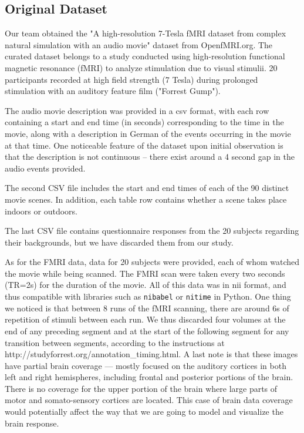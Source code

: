 
\subsection{Original Dataset}
\par Our team obtained the "A high-resolution 7-Tesla fMRI dataset from complex natural simulation with an audio movie" dataset from OpenfMRI.org.\cite{Hanke} The curated dataset belongs to a study conducted using high-resolution functional magnetic resonance (fMRI) to analyze stimulation due to visual stimulii. 20 participants recorded at high field strength (7 Tesla) during prolonged stimulation with an auditory feature film ("Forrest Gump"). 

\par The audio movie description was provided in a csv format, with each row containing a start and end time (in seconds) corresponding to the time in the movie, along with a description in German of the events occurring in the movie at that time. One noticeable feature of the dataset upon initial observation is that the description is not continuous -- there exist around a 4 second gap in the audio events provided. 

\par The second CSV file includes the start and end times of each of the 90 distinct movie scenes. In addition, each table row contains whether a scene takes place indoors or outdoors. 

\par The last CSV file contains questionnaire responses from the 20 subjects regarding their backgrounds,  but we have discarded them from our study. 

\par As for the FMRI data, data for 20 subjects were provided, each of whom watched the movie while being scanned. The FMRI scan were taken every two seconds (TR=2s) for the duration of the movie. All of this data was in nii format, and thus compatible with libraries such as \texttt{nibabel} or \texttt{nitime} in Python. One thing we noticed is that between 8 runs of the fMRI scanning, there are around 6s of repetition of stimuli between each run. We thus discarded four volumes at the end of any preceding segment and at the start of the following segment for any transition between segments, according to the instructions at http://studyforrest.org/annotation\_timing.html. A last note is that these images have partial brain coverage — mostly focused on the auditory cortices in both left and right hemispheres, including frontal and posterior portions of the brain. There is no coverage for the upper portion of the brain where large parts of motor and somato-sensory cortices are located. This case of brain data coverage would potentially affect the way that we are going to model and visualize the brain response.

